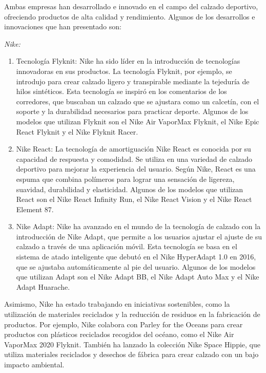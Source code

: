 \documentclass[a4paper,12pt]{article}
\begin{document}
Ambas empresas han desarrollado e innovado en el campo del calzado deportivo, ofreciendo productos de alta calidad y rendimiento. Algunos de los desarrollos e innovaciones que han presentado son:

\emph{Nike:}

\begin{enumerate}
	\item Tecnología Flyknit: Nike ha sido líder en la introducción de tecnologías innovadoras en sus productos. La tecnología Flyknit, por ejemplo, se introdujo para crear calzado ligero y transpirable mediante la tejeduría de hilos sintéticos. Esta tecnología se inspiró en los comentarios de los corredores, que buscaban un calzado que se ajustara como un calcetín, con el soporte y la durabilidad necesarios para practicar deporte. Algunos de los modelos que utilizan Flyknit son el Nike Air VaporMax Flyknit, el Nike Epic React Flyknit y el Nike Flyknit Racer.
	\item Nike React: La tecnología de amortiguación Nike React es conocida por su capacidad de respuesta y comodidad. Se utiliza en una variedad de calzado deportivo para mejorar la experiencia del usuario. Según Nike, React es una espuma que combina polímeros para lograr una sensación de ligereza, suavidad, durabilidad y elasticidad. Algunos de los modelos que utilizan React son el Nike React Infinity Run, el Nike React Vision y el Nike React Element 87.
	\item Nike Adapt: Nike ha avanzado en el mundo de la tecnología de calzado con la introducción de Nike Adapt, que permite a los usuarios ajustar el ajuste de su calzado a través de una aplicación móvil. Esta tecnología se basa en el sistema de atado inteligente que debutó en el Nike HyperAdapt 1.0 en 2016, que se ajustaba automáticamente al pie del usuario. Algunos de los modelos que utilizan Adapt son el Nike Adapt BB, el Nike Adapt Auto Max y el Nike Adapt Huarache.
\end{enumerate}

Asimismo, Nike ha estado trabajando en iniciativas sostenibles, como la utilización de materiales reciclados y la reducción de residuos en la fabricación de productos. Por ejemplo, Nike colabora con Parley for the Oceans para crear productos con plásticos reciclados recogidos del océano, como el Nike Air VaporMax 2020 Flyknit. También ha lanzado la colección Nike Space Hippie, que utiliza materiales reciclados y desechos de fábrica para crear calzado con un bajo impacto ambiental.
\end{document}
